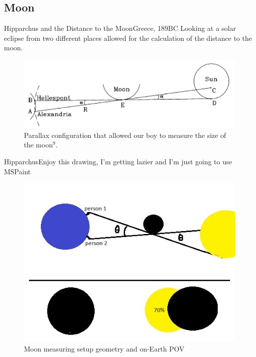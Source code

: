 \documentclass[12pt]{beamer}
\begin{document}
    \subsection{Moon}
        \begin{frame}{Hipparchus and the Distance to the Moon}{Greece, 189BC} \centering
            Looking at a solar eclipse from two different places allowed for the calculation of the distance to the moon.
            \begin{figure}
                \includegraphics[scale=0.5, frame, bb=0 0 430 150]{hipparchus.png}
                \caption{Parallax configuration that allowed our boy to measure the size of the moon$^9$.}
            \end{figure}
        \end{frame}
        \begin{frame}{Hipparchus}{Enjoy this drawing, I'm getting lazier and I'm just going to use MSPaint}
            \begin{figure}
                \includegraphics[scale=0.5, frame]{hipparchuspaint.jpg}
                \caption{Moon measuring setup geometry and on-Earth POV}
            \end{figure}
        \end{frame}
\end{document}
